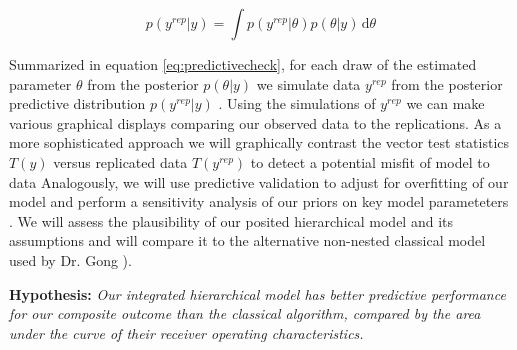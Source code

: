 \documentclass[11pt,notitlepage]{article}
\begin{document}
\begin{figure}
\vspace{-25pt}
\begin{equation} \label{eq:predictivecheck}
 p(y^{rep}|y)  = \int \! p(y^{rep}|\theta) p(\theta|y) \, \mathrm{d}\theta 
\end{equation}
\vspace{-25pt}
\end{figure}

\vspace{5pt} Summarized in equation \ref{eq:predictivecheck}, for each draw of the estimated parameter $\theta$ from the posterior $p(\theta|y)$ we simulate data $y^{rep}$ from the posterior predictive distribution $ p(y^{rep}|y) $ . Using the simulations of $y^{rep}$ we can make various graphical displays comparing our observed data to the replications. As a more sophisticated approach we will graphically contrast the vector test statistics $T(y)$ versus replicated data $T(y^{rep})$ to detect a potential misfit of model to data \cite{Gelman2004posteriorpredictivechecks,Buja1999inference} Analogously, we will use predictive validation to adjust for overfitting of our model and perform a sensitivity analysis of our priors on key model parameteters \cite{Gelman-Hill_2014,Gelman_predictive_2000}. We will assess the plausibility of our posited hierarchical model and its assumptions \cite{Gelman_predictive_2000,GelmanMengStern1996} and will compare it to the alternative non-nested classical model used by Dr. Gong \cite{Herridge_12594312}).

\begin{flushleft}
\textbf{Hypothesis:} \textit{Our integrated hierarchical model has better predictive performance for our composite outcome than the classical algorithm, compared by the area under the curve of their receiver operating characteristics.}
\end{flushleft}
\end{document}
